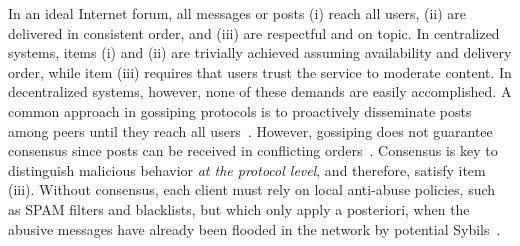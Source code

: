 \documentclass[12pt]{article}
\begin{document}
In an ideal Internet forum, all messages or posts
(i)   reach all users,
(ii)  are delivered in consistent order, and
(iii) are respectful and on topic.
In centralized systems, items (i) and (ii) are trivially achieved assuming
availability and delivery order, while item (iii) requires that users trust the
service to moderate content.
In decentralized systems, however, none of these demands are easily
accomplished.
A common approach in gossiping protocols is to proactively disseminate posts
among peers until they reach all users~\cite{p2p.survey,p2p.byz}.
However, gossiping does not guarantee consensus since posts can be received in
conflicting orders~\cite{p2p.intention}.
%
Consensus is key to distinguish malicious behavior \emph{at the protocol
level}, and therefore, satisfy item (iii).
Without consensus, each client must rely on local anti-abuse policies, such as
SPAM filters and blacklists, but which only apply a posteriori, when the
abusive messages have already been flooded in the network by potential
Sybils~\cite{p2p.sybil}.
%

\end{document}
